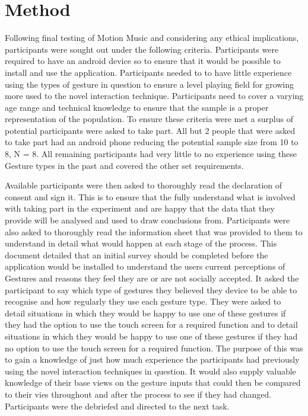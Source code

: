 \documentclass{l4proj}
\begin{document}
\section{Method}
Following final testing of Motion Music and considering any ethical implications, participants were sought out under the following criteria. Participants were required to have an android device so to ensure that it would be possible to install and use the application. Participants needed to to have little experience using the types of gesture in question to ensure a level playing field for growing more used to the novel interaction technique. Participants need to cover a varying age range and technical knowledge to ensure that the sample is a proper representation of the population. To ensure these criteria were met a surplus of potential participants were asked to take part. All but 2 people that were asked to take part had an android phone reducing the potential sample size from 10 to 8, N = 8. All remaining participants had very little to no experience using these Gesture types in the past and covered the other set requirements.

Available participants were then asked to thoroughly read the declaration of consent and sign it. This is to ensure that the fully understand what is involved with taking part in the experiment and are happy that the data that they provide will be analysed and used to draw conclusions from. Participants were also asked to thoroughly read the information sheet that was provided to them to understand in detail what would happen at each stage of the process. This document detailed that an initial survey should be completed before the application would be installed to understand the users current perceptions of Gestures and reasons they feel they are or are not socially accepted. It asked the participant to say which type of gestures they believed they device to be able to recognise and how regularly they use each gesture type. They were asked to detail situations in which they would be happy to use one of these gestures if they had the option to use the touch screen for a required function and to detail situations in which they would be happy to use one of these gestures if they had no option to use the touch screen for a required function. The purpose of this was to gain a knowledge of just how much experience the participants had previously using the novel interaction techniques in question. It would also supply valuable knowledge of their base views on the gesture inputs that could then be compared to their vies throughout and after the process to see if they had changed.
Participants were the debriefed and directed to the next task.
\end{document}
